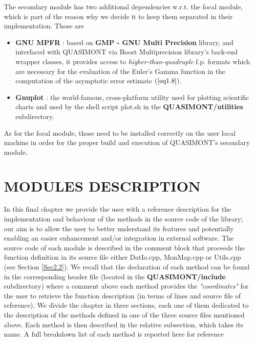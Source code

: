 \documentclass[a4paper, twosided]{book}
\begin{document}
The secondary module has two additional dependencies w.r.t. the focal module, which is part of the reason why we decide it to keep them separated in their implementation. Those are
\begin{itemize}
    \item \color{poliDarkBlue} \textbf{GNU MPFR} \color{black}\cite{mpfr}: based on \color{poliDarkBlue} \textbf{GMP - GNU Multi Precision} \color{black} library, and interfaced with QUASIMONT via Boost Multiprecision library's back-end wrapper classes, it provides access to {\itshape higher-than-quadruple} f.p. formats which are necessary for the evaluation of the Euler's Gamma function in the computation of the asymptotic error estimate $(\ref{eq1.8})$.
    \item \color{poliDarkBlue} \textbf{Gnuplot} \color{black}: the world-famous, cross-platform utility used for plotting scientific charts and used by the shell script \colorbox{poliGrayBlue}{plot.sh} in the \colorbox{poliGrayBlue}{\textbf{QUASIMONT/utilities}} subdirectory.
\end{itemize}

As for the focal module, those need to be installed correctly on the user local machine in order for the proper build and execution of QUASIMONT's secondary module.

\chapter[Modules description]{\Huge \ttfamily MODULES DESCRIPTION}\label{Chap4}

In this final chapter we provide the user with a reference description for the implementation and behaviour of the methods in the source code of the library; our aim is to allow the user to better understand its features and potentially enabling an easier enhancement and/or integration in external software. The source code of each module is described in the comment block that proceeds the function definition in its source file either \colorbox{poliGrayBlue}{DatIo.cpp}, \colorbox{poliGrayBlue}{MonMap.cpp} or \colorbox{poliGrayBlue}{Utils.cpp} (see Section \ref{Sec2.2}). We recall that the declaration of each method can be found in the corresponding header file (located in the \colorbox{poliGrayBlue}{\textbf{QUASIMONT/include}} subdirectory) where a comment above each method provides the \textsl{"coordinates"} for the user to retrieve the function description (in terms of lines and source file of reference). We divide the chapter in three sections, each one of them dedicated to the description of the methods defined in one of the three source files mentioned above. Each method is then described in the relative subsection, which takes its name. A full breakdown list of each method is reported here for reference
\end{document}
